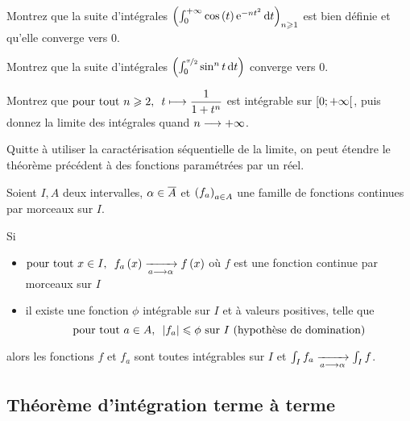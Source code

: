 \begin{exo}
Montrez que la suite d'intégrales \(\paren{\int_0^{\pinf}\cos\paren{t}\e{-nt^2}\odif{t}}_{n\geq1}\) est bien définie et qu'elle converge vers \(0\).
\end{exo}

\begin{exo}
Montrez que la suite d'intégrales \(\paren{\int_0^{\nicefrac{\pi}{2}}\sin^nt\odif{t}}\) converge vers \(0\).
\end{exo}

\begin{exo}
Montrez que \(\quantifs{\tpt n\geq2}t\mapsto\dfrac{1}{1+t^n}\) est intégrable sur \(\left[0;+\infty\right[\), puis donnez la limite des intégrales quand \(n\longrightarrow+\infty\).
\end{exo}

Quitte à utiliser la caractérisation séquentielle de la limite, on peut étendre le théorème précédent à des fonctions paramétrées par un réel.

\begin{theo}
Soient \(I,A\) deux intervalles, \(\alpha\in\overline{A}\) et \(\left(f_a\right)_{a\in A}\) une famille de fonctions continues par morceaux sur \(I\).

Si

\begin{itemize}
    \item \(\quantifs{\tpt x\in I}f_a\paren{x}\tendqd{a\to\alpha}f\paren{x}\) où \(f\) est une fonction continue par morceaux sur \(I\) \\
    \item il existe une fonction \(\phi\) intégrable sur \(I\) et à valeurs positives, telle que \[\quantifs{\tpt a\in A}\abs{f_a}\leq\phi\text{ sur \(I\) (hypothèse de domination)}\]
\end{itemize}

alors les fonctions \(f\) et \(f_a\) sont toutes intégrables sur \(I\) et \(\int_If_a\xrightarrow[a\longrightarrow\alpha]{}\int_If\).
\end{theo}

\subsection{Théorème d'intégration terme à terme}

